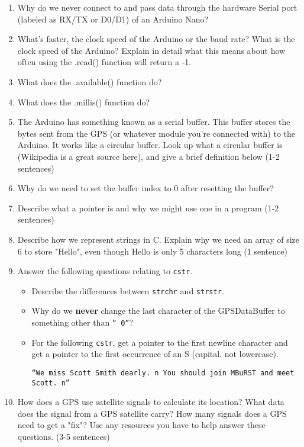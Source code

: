 \begin{enumerate}
		\item Why do we never connect to and pass data through the hardware Serial port (labeled as RX/TX or D0/D1) of an Arduino Nano?
        
		\item What's faster, the clock speed of the Arduino or the baud rate? What is the clock speed of the Arduino? Explain in detail what this means about how often using the .read() function will return a -1. 
        
		\item What does the .available() function do?
		
		\item What does the .millis() function do?
		
    	\item The Arduino has something known as a serial buffer. This buffer stores the bytes sent from the GPS (or whatever module you're connected with) to the Arduino. It works like a circular buffer. Look up what a circular buffer is (Wikipedia is a great source here), and give a brief definition below (1-2 sentences)
    	
        \item Why do we need to set the buffer index to 0 after resetting the buffer?
        
        \item Describe what a pointer is and why we might use one in a program (1-2 sentences)
        
        \item Describe how we represent strings in C. Explain why we need an array of size 6 to store "Hello", even though Hello is only 5 characters long (1 sentence)
        
        \item Answer the following questions relating to \texttt{cstr}.
        \begin{itemize}
            \item Describe the differences between \texttt{strchr} and \texttt{strstr}.
            \item Why do we \textbf{never} change the last character of the GPSDataBuffer to something other than \texttt{``\\0''}?
            \item For the following \texttt{cstr}, get a pointer to the first newline character and get a pointer to the first occurrence of an S (capital, not lowercase). 
            
            \texttt{``We miss Scott Smith dearly.\\n You should join MBuRST and meet Scott.\\n''}
        \end{itemize}
        
        \item How does a GPS use satellite signals to calculate its location? What data does the signal from a GPS satellite carry? How many signals does a GPS need to get a "fix"? Use any resources you have to help answer these questions. (3-5 sentences)
        
	\end{enumerate}
    

